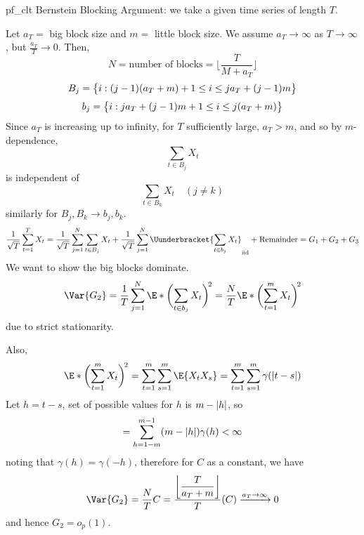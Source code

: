 \begin{Proof}{}{pf_clt}
    Bernstein Blocking Argument: we take a given time series of length $ T $.

    Let $ a_T= $ big block size and $ m= $ little block size.
    We assume $ a_T\to\infty $ as $ T\to\infty $, but $ \displaystyle \frac{a_T}{T}\to 0 $.
    Then,
    \[ N=\text{number of blocks}=\biggl\lfloor \frac{T}{M+a_T} \biggr\rfloor \]
    \[ B_j=\set[\big]{i:(j-1)(a_T+m)+1\le i\le j a_T+(j-1)m} \]
    \[ b_j=\set[\big]{i:j a_T+(j-1)m+1\le i\le j(a_T+m)} \]
    Since $ a_T $ is increasing up to infinity, for $ T $
    sufficiently large, $ a_T>m $, and so
    by $ m $-dependence,
    \[ \sum_{t\in B_j}X_t  \]
    is independent of
    \[ \sum_{t\in B_k}X_t\quad(j\ne k)  \]
    similarly for $ B_j,B_k\to b_j,b_k $.
    \[ \frac{1}{\sqrt{T}}\sum_{t=1}^{T} X_t=\frac{1}{\sqrt{T}}
        \sum_{j=1}^{N}\sum_{t\in B_j}X_t+\frac{1}{\sqrt{T}} \sum_{j=1}^{N}
        \Uunderbracket{\sum_{t\in b_j}X_t}_{\text{iid}}+\text{Remainder}=G_1+G_2+G_3    \]
    We want to show the big blocks dominate.
    \[ \Var{G_2}=\frac{1}{T}
        \sum_{j=1}^{N}\E*{\biggl(\sum_{t\in b_j}X_t \biggr)^{\!2}}=
        \frac{N}{T}\E*{\biggl(\sum_{t=1}^{m} X_t\biggr)^{\!2}} \]
    due to strict stationarity.

    Also,
    \[ \E*{\biggl(\sum_{t=1}^{m} X_t\biggr)^{\!2}}=\sum_{t=1}^{m} \sum_{s=1}^{m} \E{X_t X_s}=
        \sum_{t=1}^{m} \sum_{s=1}^{m}\gamma(\abs{t-s})  \]
    Let $ h=t-s $, set of possible values for $ h $ is $ m-\abs{h} $, so
    \[ =\sum_{h=1-m}^{m-1} (m-\abs{h})\gamma(h)<\infty \]
    noting that $ \gamma(h)=\gamma(-h) $, therefore for $ C $ as a constant, we have
    \[ \Var{G_2}=\frac{N}{T}
        C=\frac{\displaystyle \biggl\lfloor \frac{T}{a_T+m} \biggr\rfloor}{T}(C)\xrightarrow{a_T\to\infty}0  \]
    and hence $ G_2=o_p(1) $.


\end{Proof}

